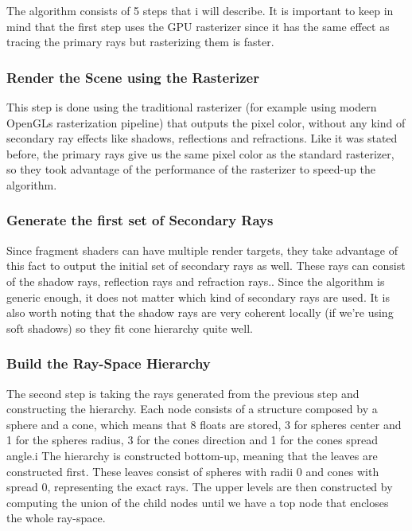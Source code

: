 \documentclass{llncs}
\begin{document}
\medskip

The algorithm consists of 5 steps that i will describe. It is important to keep in mind that the first step uses the GPU rasterizer since it has the same effect as tracing the primary rays but rasterizing them is faster.

\subsubsection{Render the Scene using the Rasterizer}

This step is done using the traditional rasterizer (for example using modern OpenGLs rasterization pipeline) that outputs the pixel color, without any kind of secondary ray effects like shadows,  reflections and refractions. Like it was stated  before, the primary rays give us the same pixel color as the standard rasterizer, so they took advantage of the performance of the rasterizer to speed-up the algorithm.

\subsubsection{Generate the first set of Secondary Rays}

Since fragment shaders can have multiple render targets, they take advantage of this fact to output the initial set of secondary rays as well. These rays can consist of the shadow rays, reflection rays and refraction rays.. Since the algorithm is generic enough, it does not matter which kind of secondary rays are used. It is also worth noting that the shadow rays are very coherent locally (if we're using soft shadows) so they fit cone hierarchy quite well.

\subsubsection{Build the Ray-Space Hierarchy}

The second step is taking the rays generated from the previous step and constructing the hierarchy. Each node consists of a structure composed by a sphere and a cone, which means that 8 floats are stored, 3 for spheres center and 1 for the spheres radius, 3 for the cones direction and 1 for the cones spread angle.i The hierarchy is constructed bottom-up, meaning that the leaves are constructed first. These leaves consist of spheres with radii 0 and cones with spread 0, representing the exact rays. The upper levels are then constructed by computing the union of the child nodes until we have a top node that encloses the whole ray-space.
\end{document}
